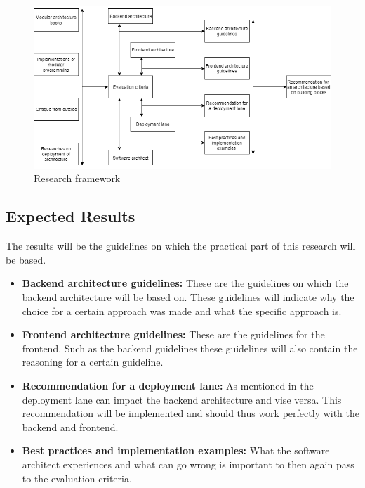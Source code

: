 \begin{figure}[H]
	\includegraphics[width=\linewidth]{research_framework.png}
	\caption{Research framework}
\end{figure}

\subsection{Expected Results}
\label{sec:ExpectedResults}

The results will be the guidelines on which the practical part of this research will be based.

\begin{itemize}
	\item \textbf{Backend architecture guidelines: } These are the guidelines on which the backend architecture will be based on. These guidelines will indicate why the choice for a certain approach was made and what the specific approach is.

	\item \textbf{Frontend architecture guidelines: } These are the guidelines for the frontend. Such as the backend guidelines these guidelines will also contain the reasoning for a certain guideline.

	\item \textbf{Recommendation for a deployment lane: } As mentioned in  the deployment lane can impact the backend architecture and vise versa. This recommendation will be implemented and should thus work perfectly with the backend and frontend.

	\item \textbf{Best practices and implementation examples: } What the software architect experiences and what can go wrong is important to then again pass to the evaluation criteria.
\end{itemize}

